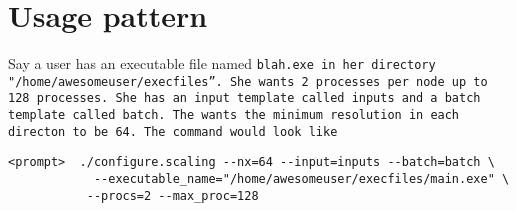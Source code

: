 \documentclass{article}
\begin{document}
\section{Usage pattern}

Say a user has an executable file named \tt{blah.exe} in her directory
"/home/awesomeuser/execfiles''.   She wants 2 processes per node up to
128 processes.   She has an input template called \tt{inputs} and a
batch template called \tt{batch}.   The wants the minimum resolution
in each directon to be 64.   The command would look like
\begin{verbatim}
<prompt>  ./configure.scaling --nx=64 --input=inputs --batch=batch \
            --executable_name="/home/awesomeuser/execfiles/main.exe" \
           --procs=2 --max_proc=128
\end{verbatim}

  
\end{document}
